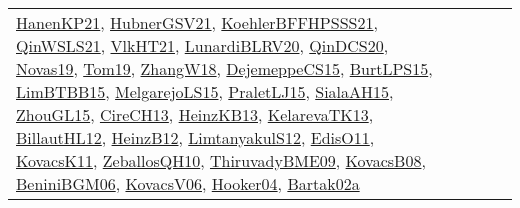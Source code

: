 {\begin{longtable}{lp{3cm}>{\raggedright}p{6cm}>{\raggedright}p{6cm}p{8cm}}
\href{papers/HanenKP21.pdf}{HanenKP21}\cite{HanenKP21}, \href{articles/HubnerGSV21.pdf}{HubnerGSV21}\cite{HubnerGSV21}, \href{articles/KoehlerBFFHPSSS21.pdf}{KoehlerBFFHPSSS21}\cite{KoehlerBFFHPSSS21}, \href{articles/QinWSLS21.pdf}{QinWSLS21}\cite{QinWSLS21}, \href{articles/VlkHT21.pdf}{VlkHT21}\cite{VlkHT21}, \href{articles/LunardiBLRV20.pdf}{LunardiBLRV20}\cite{LunardiBLRV20}, \href{articles/QinDCS20.pdf}{QinDCS20}\cite{QinDCS20}, \href{articles/Novas19.pdf}{Novas19}\cite{Novas19}, \href{papers/Tom19.pdf}{Tom19}\cite{Tom19}, \href{articles/ZhangW18.pdf}{ZhangW18}\cite{ZhangW18}, \href{papers/DejemeppeCS15.pdf}{DejemeppeCS15}\cite{DejemeppeCS15}, \href{papers/BurtLPS15.pdf}{BurtLPS15}\cite{BurtLPS15}, \href{papers/LimBTBB15.pdf}{LimBTBB15}\cite{LimBTBB15}, \href{papers/MelgarejoLS15.pdf}{MelgarejoLS15}\cite{MelgarejoLS15}, \href{papers/PraletLJ15.pdf}{PraletLJ15}\cite{PraletLJ15}, \href{papers/SialaAH15.pdf}{SialaAH15}\cite{SialaAH15}, \href{papers/ZhouGL15.pdf}{ZhouGL15}\cite{ZhouGL15}, \href{papers/CireCH13.pdf}{CireCH13}\cite{CireCH13}, \href{papers/HeinzKB13.pdf}{HeinzKB13}\cite{HeinzKB13}, \href{papers/KelarevaTK13.pdf}{KelarevaTK13}\cite{KelarevaTK13}, \href{papers/BillautHL12.pdf}{BillautHL12}\cite{BillautHL12}, \href{papers/HeinzB12.pdf}{HeinzB12}\cite{HeinzB12}, \href{articles/LimtanyakulS12.pdf}{LimtanyakulS12}\cite{LimtanyakulS12}, \href{papers/EdisO11.pdf}{EdisO11}\cite{EdisO11}, \href{articles/KovacsK11.pdf}{KovacsK11}\cite{KovacsK11}, \href{articles/ZeballosQH10.pdf}{ZeballosQH10}\cite{ZeballosQH10}, \href{papers/ThiruvadyBME09.pdf}{ThiruvadyBME09}\cite{ThiruvadyBME09}, \href{articles/KovacsB08.pdf}{KovacsB08}\cite{KovacsB08}, \href{papers/BeniniBGM06.pdf}{BeniniBGM06}\cite{BeniniBGM06}, \href{papers/KovacsV06.pdf}{KovacsV06}\cite{KovacsV06}, \href{papers/Hooker04.pdf}{Hooker04}\cite{Hooker04}, \href{papers/Bartak02a.pdf}{Bartak02a}\cite{Bartak02a}\\

\end{longtable}}
